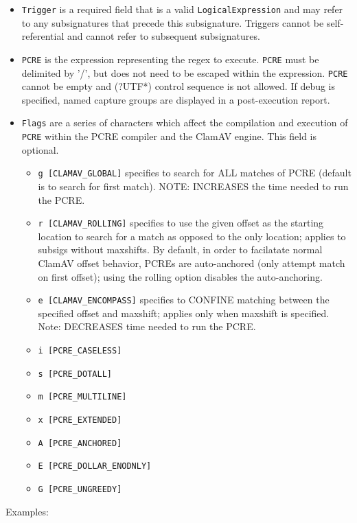 \documentclass[a4paper,titlepage,12pt]{article}
\begin{document}
    \begin{itemize}
    \item \verb+Trigger+ is a required field that is a valid \verb+LogicalExpression+ and
    may refer to any subsignatures that precede this subsignature. Triggers cannot be
    self-referential and cannot refer to subsequent subsignatures.
    \item \verb+PCRE+ is the expression representing the regex to execute. \verb+PCRE+
    must be delimited by '/', but does not need to be escaped within the expression.
    \verb+PCRE+ cannot be empty and (?UTF*) control sequence is not allowed. If debug is specified,
    named capture groups are displayed in a post-execution report.
    \item \verb+Flags+ are a series of characters which affect the compilation and execution
    of \verb+PCRE+ within the PCRE compiler and the ClamAV engine. This field is optional.
	\begin{itemize}
	\item \verb+g [CLAMAV_GLOBAL]+ specifies to search for ALL matches of PCRE (default is to
        search for first match). NOTE: INCREASES the time needed to run the PCRE.
        \item \verb+r [CLAMAV_ROLLING]+ specifies to use the given offset as the starting location
        to search for a match as opposed to the only location; applies to subsigs without maxshifts.
        By default, in order to facilatate normal ClamAV offset behavior, PCREs are auto-anchored
        (only attempt match on first offset); using the rolling option disables the auto-anchoring.
	\item \verb+e [CLAMAV_ENCOMPASS]+ specifies to CONFINE matching between the specified offset
	and maxshift; applies only when maxshift is specified. Note: DECREASES time needed to run the PCRE.
	\item \verb+i [PCRE_CASELESS]+
	\item \verb+s [PCRE_DOTALL]+
	\item \verb+m [PCRE_MULTILINE]+
	\item \verb+x [PCRE_EXTENDED]+
	\item \verb+A [PCRE_ANCHORED]+
	\item \verb+E [PCRE_DOLLAR_ENODNLY]+
	\item \verb+G [PCRE_UNGREEDY]+
	\end{itemize}
    \end{itemize}
    Examples:
\end{document}
